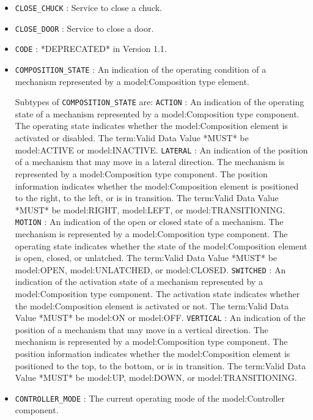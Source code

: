 \begin{itemize}
\item \texttt{CLOSE_CHUCK} : Service to close a chuck. 

\item \texttt{CLOSE_DOOR} : Service to close a door. 

\item \texttt{CODE} : *DEPRECATED* in Version 1.1. 

\item \texttt{COMPOSITION_STATE} : An indication of the operating condition of a mechanism represented by a {model:Composition} type element. 

Subtypes of \texttt{COMPOSITION_STATE} are: 
\newline\tab \texttt{ACTION} : An indication of the operating state of a mechanism represented by a {model:Composition} type component.
 The operating state indicates whether the {model:Composition} element is activated or disabled. 
 The {term:Valid Data Value} *MUST* be {model:ACTIVE} or {model:INACTIVE}. 
\newline\tab \texttt{LATERAL} : An indication of the position of a mechanism that may move in a lateral direction.   The mechanism is represented by a {model:Composition} type component. 
 The position information indicates whether the {model:Composition} element is positioned to the right, to the left, or is in transition.  
 The {term:Valid Data Value} *MUST* be {model:RIGHT}, {model:LEFT}, or {model:TRANSITIONING}. 
\newline\tab \texttt{MOTION} : An indication of the open or closed state of a mechanism.   The mechanism is represented by a {model:Composition} type component. 
 The operating state indicates whether the state of the {model:Composition} element is open, closed, or unlatched.   
 The {term:Valid Data Value} *MUST* be {model:OPEN}, {model:UNLATCHED}, or {model:CLOSED}. 
\newline\tab \texttt{SWITCHED} : An indication of the activation state of a mechanism represented by a {model:Composition} type component.
 The activation state indicates whether the {model:Composition} element is activated or not.
 The {term:Valid Data Value} *MUST* be {model:ON} or {model:OFF}. 
\newline\tab \texttt{VERTICAL} : An indication of the position of a mechanism that may move in a vertical direction. The mechanism is represented by a {model:Composition} type component. 
 The position information indicates whether the {model:Composition} element is positioned to the top, to the bottom, or is in transition.  
 The {term:Valid Data Value} *MUST* be {model:UP}, {model:DOWN}, or {model:TRANSITIONING}. 
\item \texttt{CONTROLLER_MODE} : The current operating mode of the {model:Controller} component. 


\end{itemize}
